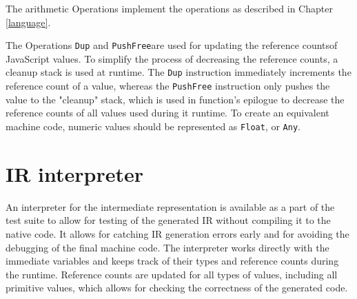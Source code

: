 The arithmetic Operations implement the operations as described in Chapter \ref{language}.

The Operations \texttt{Dup} and \texttt{PushFree}\footnotemark[1] are used for updating the reference counts\footnotemark[2] of JavaScript values. To simplify the process of decreasing the reference counts, a cleanup stack is used at runtime. The \texttt{Dup} instruction immediately increments the reference count of a value, whereas the \texttt{PushFree} instruction only pushes the value to the "cleanup" stack, which is used in function's epilogue to decrease the reference counts of all values used during it runtime. To create an equivalent machine code, numeric values should be represented as \texttt{Float}, or \texttt{Any}\footnotemark[3].





\section{IR interpreter}

An interpreter for the intermediate representation is available as a part of the test suite to allow for testing of the generated IR without compiling it to the native code. It allows for catching IR generation errors early and for avoiding the debugging of the final machine code. The interpreter works directly with the immediate variables and keeps track of their types and reference counts during the runtime. Reference counts are updated for all types of values, including all primitive values, which allows for checking the correctness of the generated code.
